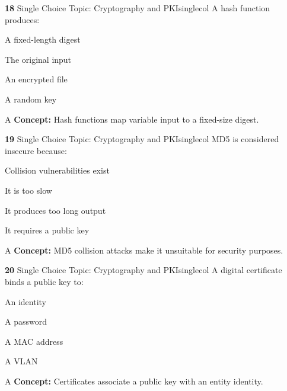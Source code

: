 \documentclass[10pt,a4paper]{article}
\begin{document}
\begin{qcard}{\color{white}\textbf{18} \hfill \small Single Choice \textbar{} Topic: Cryptography and PKI}{singlecol}
A hash function produces:

\begin{qoptions}
\item A fixed-length digest
\item The original input
\item An encrypted file
\item A random key
\end{qoptions}
\begin{explainbox}{A}
\textbf{Concept:} Hash functions map variable input to a fixed-size digest.
\end{explainbox}
\end{qcard}

\begin{qcard}{\color{white}\textbf{19} \hfill \small Single Choice \textbar{} Topic: Cryptography and PKI}{singlecol}
MD5 is considered insecure because:

\begin{qoptions}
\item Collision vulnerabilities exist
\item It is too slow
\item It produces too long output
\item It requires a public key
\end{qoptions}
\begin{explainbox}{A}
\textbf{Concept:} MD5 collision attacks make it unsuitable for security purposes.
\end{explainbox}
\end{qcard}

\begin{qcard}{\color{white}\textbf{20} \hfill \small Single Choice \textbar{} Topic: Cryptography and PKI}{singlecol}
A digital certificate binds a public key to:

\begin{qoptions}
\item An identity
\item A password
\item A MAC address
\item A VLAN
\end{qoptions}
\begin{explainbox}{A}
\textbf{Concept:} Certificates associate a public key with an entity identity.
\end{explainbox}
\end{qcard}
\end{document}
